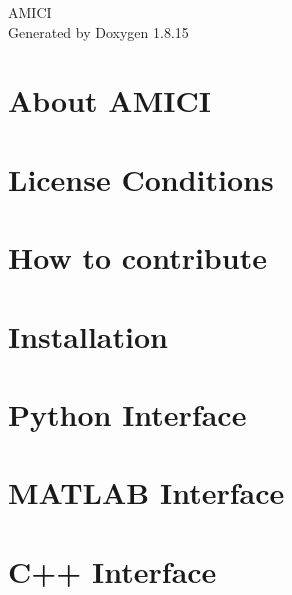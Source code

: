 \let\mypdfximage\pdfximage\def\pdfximage{\immediate\mypdfximage}\documentclass[twoside]{article}
\newcommand{\+}{\discretionary{\mbox{\scriptsize$\hookleftarrow$}}{}{}}
\begin{document}
\hypersetup{pageanchor=false,
             bookmarksnumbered=true,
             pdfencoding=unicode
            }
\begin{titlepage}
\vspace*{7cm}
\begin{center}%
{\Large A\+M\+I\+CI }\\
\vspace*{1cm}
{\large Generated by Doxygen 1.8.15}\\
\end{center}
\end{titlepage}
\tableofcontents
{}
\hypersetup{pageanchor=true}

\section{About A\+M\+I\+CI}
\label{index}\hypertarget{index}{}
\section{License Conditions}
\label{md__l_i_c_e_n_s_e}

\section{How to contribute}
\label{md__c_o_n_t_r_i_b_u_t_i_n_g}

\section{Installation}
\label{md__i_n_s_t_a_l_l}

\section{Python Interface}
\label{python_interface}

\section{M\+A\+T\+L\+AB Interface}
\label{matlab_interface}

\section{C++ Interface}
\label{md_documentation__c_p_p}

\end{document}
